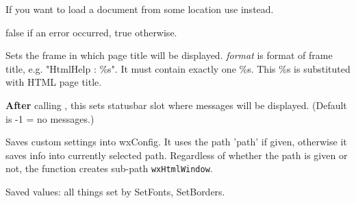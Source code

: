 If you want to load a document from some location use 
 instead.




false if an error occurred, true otherwise.

\label{wxhtmlwindowsetrelatedframe}


Sets the frame in which page title will be displayed. {\it format} is format of
frame title, e.g. "HtmlHelp : \%s". It must contain exactly one \%s. This
\%s is substituted with HTML page title.

\label{wxhtmlwindowsetrelatedstatusbar}


{\bf After} calling ,
this sets statusbar slot where messages will be displayed.
(Default is -1 = no messages.)




\label{wxhtmlwindowwritecustomization}


Saves custom settings into wxConfig. It uses the path 'path'
if given, otherwise it saves info into currently selected path.
Regardless of whether the path is given or not, the function creates sub-path 
{\tt wxHtmlWindow}.

Saved values: all things set by SetFonts, SetBorders.




